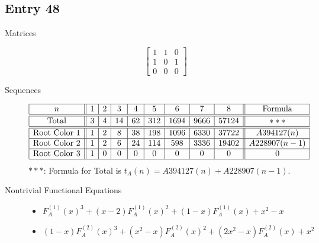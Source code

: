 \documentclass[12pt]{amsart}
\newcommand{\gff}[2]{F_{#2}^{(#1)}(x)}
\newcommand{\gfa}[1]{\gff{#1}{A}}
\begin{document}
\subsection*{Entry 48}
\begin{description}
    \item[Matrices]
    
    \[\begin{bmatrix}
1 & 1 & 0 \\
1 & 0 & 1 \\
0 & 0 & 0
\end{bmatrix}\]
    \item[Sequences]\hspace*{\fill}\vspace{-0.5cm}
    \begin{center}
        \[
        \begin{array}{|c||c|c|c|c|c|c|c|c||c|}\hline
           n  & 1 & 2 & 3 & 4 & 5 & 6 & 7 & 8  & \text{Formula}\\\hline\hline
           \text{Total}  & 3 & 4 & 14 & 62 & 312 & 1694 & 9666 & 57124 & ***\\\hline\hline
           \text{Root Color }1 & 1 & 2 & 8 & 38 & 198 & 1096 & 6330 & 37722 & A394127(n) \\\hline
           \text{Root Color }2 & 1 & 2 & 6 & 24 & 114 & 598 & 3336 & 19402 & A228907(n-1)\\\hline
           \text{Root Color }3 & 1 & 0 & 0 & 0 & 0 & 0 & 0 & 0 & 0\\\hline
        \end{array}
        \]
        $***$: Formula for Total is $t_A(n)=A394127(n)+A228907(n-1)$.
    \end{center}
    
    \item[Nontrivial Functional Equations]\hspace*{\fill}

    \begin{itemize}
\item $\gfa{1}^3+(x - 2)\gfa{1}^2+(1 - x)\gfa{1}+x^2 - x$


\item $(1 - x)\gfa{2}^3+(x^2 - x)\gfa{2}^2+(2x^2 - x)\gfa{2}+x^2$



\end{itemize}
\end{description}
\end{document}
